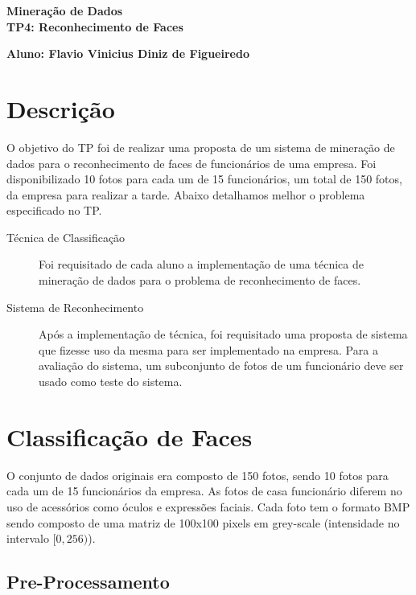 \documentclass[brazil,a4paper,12pt]{article}
\begin{document}
\begin{center}
\LARGE
\textbf{Mineração de Dados}\\
\textbf{TP4: Reconhecimento de Faces}\\
\end{center}
\begin{center}
\textbf{Aluno: Flavio Vinicius Diniz de Figueiredo}
\end{center}

\section{Descrição}

O objetivo do TP foi de realizar uma proposta de um sistema de mineração de
dados para o reconhecimento de faces de funcionários de uma empresa. Foi
disponibilizado 10 fotos para cada um de 15 funcionários, um total de 150 fotos, 
da empresa para realizar a tarde. Abaixo detalhamos melhor o problema 
especificado no TP.

\begin{description}

\item [Técnica de Classificação] Foi requisitado de cada aluno a implementação de
uma técnica de mineração de dados para o problema de reconhecimento de faces.

\item [Sistema de Reconhecimento] Após a implementação de técnica, foi
requisitado uma proposta de sistema que fizesse uso da mesma para ser
implementado na empresa. Para a avaliação do sistema, um subconjunto de fotos
de um funcionário deve ser usado como teste do sistema. 

\end{description}

\section{Classificação de Faces}

O conjunto de dados originais era composto de 150 fotos, sendo 10 fotos para
cada um de 15 funcionários da empresa. As fotos de casa funcionário diferem
no uso de acessórios como óculos e expressões faciais. Cada foto tem o formato
BMP sendo composto de uma matriz de 100x100 pixels em grey-scale 
(intensidade no intervalo $[0, 256)$).

\subsection{Pre-Processamento}
\end{document}
